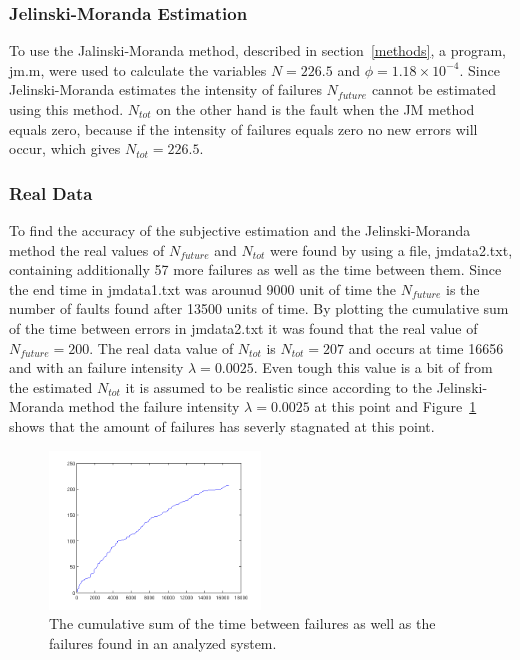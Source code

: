\subsubsection*{Jelinski-Moranda Estimation}
\label{jmestimation}
To use the Jalinski-Moranda method, described in section~\ref{methods}, a program, jm.m, were used to calculate the variables $N=226.5$ and $\phi=1.18\times10^{-4}$. Since Jelinski-Moranda estimates the intensity of failures $N_{future}$ cannot be estimated using this method.
$N_{tot}$ on the other hand is the fault when the JM method equals zero, because if the intensity of failures equals zero no new errors will occur, which gives $N_{tot}=226.5$.

\subsubsection*{Real Data}
\label{realdatajm}
To find the accuracy of the subjective estimation and the Jelinski-Moranda method the real values of $N_{future}$ and $N_{tot}$ were found by using a file, jmdata2.txt, containing additionally 57 more failures as well as the time between them. Since the end time in jmdata1.txt was arounud 9000 unit of time the $N_{future}$ is the number of faults found after 13500 units of time. By plotting the cumulative sum of the time between errors in jmdata2.txt it was found that the real value of $N_{future}=200$. The real data value of $N_{tot}$ is $N_{tot}=207$ and occurs at time 16656 and with an failure intensity $\lambda=0.0025$. Even tough this value is a bit of from the estimated $N_{tot}$ it is assumed to be realistic since according to the Jelinski-Moranda method the failure intensity $\lambda=0.0025$ at this point and Figure~\ref{cumulativejmdata2} shows that the amount of failures has severly stagnated at this point.



\begin{figure}[htb!]
\begin{center}
	\includegraphics[width=0.5\textwidth]{cumsumjmdata2.png}
\caption{The cumulative sum of the time between failures as well as the failures found in an analyzed system.}
\end{center}
\label{cumulativejmdata2}
\end{figure}



